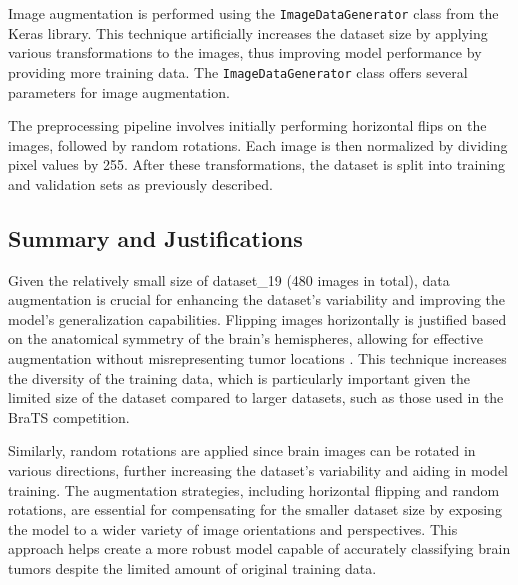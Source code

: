 Image augmentation is performed using the \texttt{ImageDataGenerator} class from the Keras library. This technique artificially increases the dataset size by applying various transformations to the images, thus improving model performance by providing more training data. The \texttt{ImageDataGenerator} class offers several parameters for image augmentation.

The preprocessing pipeline involves initially performing horizontal flips on the images, followed by random rotations. Each image is then normalized by dividing pixel values by 255. After these transformations, the dataset is split into training and validation sets as previously described.

\subsection{Summary and Justifications}

Given the relatively small size of dataset\_19 (480 images in total), data augmentation is crucial for enhancing the dataset's variability and improving the model's generalization capabilities. Flipping images horizontally is justified based on the anatomical symmetry of the brain's hemispheres, allowing for effective augmentation without misrepresenting tumor locations \cite{nalepa_data_2019}. This technique increases the diversity of the training data, which is particularly important given the limited size of the dataset compared to larger datasets, such as those used in the BraTS competition.

Similarly, random rotations are applied since brain images can be rotated in various directions, further increasing the dataset's variability and aiding in model training. The augmentation strategies, including horizontal flipping and random rotations, are essential for compensating for the smaller dataset size by exposing the model to a wider variety of image orientations and perspectives. This approach helps create a more robust model capable of accurately classifying brain tumors despite the limited amount of original training data.

